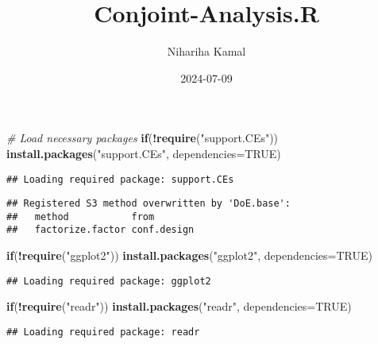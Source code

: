 \documentclass[
]{article}
\title{Conjoint-Analysis.R}
\author{Nihariha Kamal}
\date{2024-07-09}
\newenvironment{Shaded}{\begin{snugshade}}{\end{snugshade}}
\newcommand{\AttributeTok}[1]{\textcolor[rgb]{0.13,0.29,0.53}{#1}}
\newcommand{\CommentTok}[1]{\textcolor[rgb]{0.56,0.35,0.01}{\textit{#1}}}
\newcommand{\ConstantTok}[1]{\textcolor[rgb]{0.56,0.35,0.01}{#1}}
\newcommand{\ControlFlowTok}[1]{\textcolor[rgb]{0.13,0.29,0.53}{\textbf{#1}}}
\newcommand{\FunctionTok}[1]{\textcolor[rgb]{0.13,0.29,0.53}{\textbf{#1}}}
\newcommand{\NormalTok}[1]{#1}
\newcommand{\SpecialCharTok}[1]{\textcolor[rgb]{0.81,0.36,0.00}{\textbf{#1}}}
\newcommand{\StringTok}[1]{\textcolor[rgb]{0.31,0.60,0.02}{#1}}
\begin{document}
\maketitle

\begin{Shaded}
\begin{Highlighting}[]
\CommentTok{\# Load necessary packages}
\ControlFlowTok{if}\NormalTok{(}\SpecialCharTok{!}\FunctionTok{require}\NormalTok{(}\StringTok{"support.CEs"}\NormalTok{)) }\FunctionTok{install.packages}\NormalTok{(}\StringTok{"support.CEs"}\NormalTok{, }\AttributeTok{dependencies=}\ConstantTok{TRUE}\NormalTok{)}
\end{Highlighting}
\end{Shaded}

\begin{verbatim}
## Loading required package: support.CEs
\end{verbatim}

\begin{verbatim}
## Registered S3 method overwritten by 'DoE.base':
##   method           from       
##   factorize.factor conf.design
\end{verbatim}

\begin{Shaded}
\begin{Highlighting}[]
\ControlFlowTok{if}\NormalTok{(}\SpecialCharTok{!}\FunctionTok{require}\NormalTok{(}\StringTok{"ggplot2"}\NormalTok{)) }\FunctionTok{install.packages}\NormalTok{(}\StringTok{"ggplot2"}\NormalTok{, }\AttributeTok{dependencies=}\ConstantTok{TRUE}\NormalTok{)}
\end{Highlighting}
\end{Shaded}

\begin{verbatim}
## Loading required package: ggplot2
\end{verbatim}

\begin{Shaded}
\begin{Highlighting}[]
\ControlFlowTok{if}\NormalTok{(}\SpecialCharTok{!}\FunctionTok{require}\NormalTok{(}\StringTok{"readr"}\NormalTok{)) }\FunctionTok{install.packages}\NormalTok{(}\StringTok{"readr"}\NormalTok{, }\AttributeTok{dependencies=}\ConstantTok{TRUE}\NormalTok{)}
\end{Highlighting}
\end{Shaded}

\begin{verbatim}
## Loading required package: readr
\end{verbatim}
\end{document}
